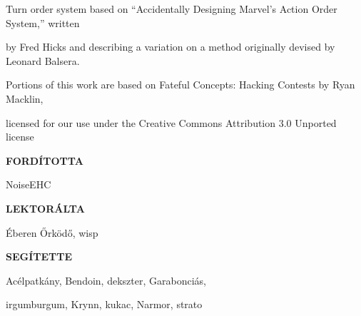 \begin{center}
Turn order system based on “Accidentally Designing Marvel’s Action Order System,” written

by Fred Hicks and describing a variation on a method originally devised by Leonard Balsera.

Portions of this work are based on Fateful Concepts: Hacking Contests by Ryan Macklin,

licensed for our use under the Creative Commons Attribution 3.0 Unported license

\vspace{2em}

\textbf{FORDÍTOTTA}

NoiseEHC

\textbf{LEKTORÁLTA}

Éberen Őrködő, wisp

\textbf{SEGÍTETTE}

Acélpatkány, Bendoin, dekszter, Garabonciás,

irgumburgum, Krynn, kukac, Narmor, strato
\end{center}
